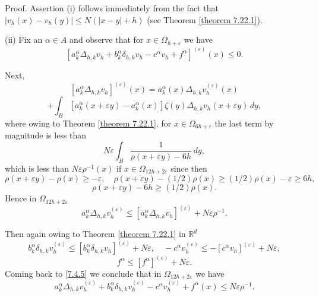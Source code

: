 \documentclass[11pt, reqno]{amsart}
\theoremstyle{definition}
\theoremstyle{remark}
\begin{document}
Proof. Assertion (i) follows immediately from the fact that
$|v_{h}(x)-v_{h}(y)|\leq N(|x-y|+h)$ (see
Theorem \ref{theorem 7.22.1}).

(ii) Fix an $\alpha\in A$ and
observe that for $x\in\Omega_{h+\varepsilon}$ we have
\begin{equation}
                                                    \label{7.4.5}
[ a_{k}^{\alpha} \Delta_{h,k}v _{h} 
+b_{k}^{\alpha} \delta_{h,k}v _{h} 
-c^{\alpha} v _{h} +f^{\alpha} ]
^{ (\varepsilon)} (x)\leq0.
\end{equation}

Next,
$$
[ a_{k}^{\alpha} \Delta_{h,k}v _{h} ]
^{ (\varepsilon)} (x)=a_{k}^{\alpha}(x)
\Delta_{h,k}v^{ (\varepsilon)}_{h}  
 (x)
$$
$$
+\int_{B }[a_{k}^{\alpha}(x
+\varepsilon y)-a_{k}^{\alpha}(x)]\zeta(y)
\Delta_{h,k}v _{h}(x
+\varepsilon y)\,dy,
$$
where owing to Theorem \ref{theorem 7.22.1},
for $x\in\Omega_{6h+\varepsilon}$ the last term by magnitude
is less than
$$
N\varepsilon\int_{B }\frac{1}{\rho(x+\varepsilon y)-6h}\,dy,
$$
which is less than $N\varepsilon \rho^{-1}(x)$ if
$x\in\Omega_{12h+2\varepsilon}$ since then
$$
\rho(x+\varepsilon y)-\rho(x)\geq-\varepsilon,
\quad  \rho(x+\varepsilon y)-(1/2)\rho(x)\geq(1/2)\rho(x)
-\varepsilon\geq 6h,
$$
$$
\rho(x+\varepsilon y)-6h\geq(1/2)\rho(x).
$$
Hence in $\Omega_{12h+2\varepsilon}$
$$
a_{k}^{\alpha} 
\Delta_{h,k}v^{ (\varepsilon)}_{h}  \leq 
[ a_{k}^{\alpha} \Delta_{h,k}v _{h} ]
^{ (\varepsilon)} + N\varepsilon \rho^{-1}.
$$

Then again owing to Theorem \ref{theorem 7.22.1}
in ${\mathbb{R}}^{d}$
$$
b_{k}^{\alpha} 
\delta_{h,k}v^{ (\varepsilon)}_{h} \leq 
[ b_{k}^{\alpha} \delta_{h,k}v _{h} ]
^{ (\varepsilon)}  + N\varepsilon,
\quad -c^{\alpha} 
 v^{ (\varepsilon)}_{h} \leq -[ c^{\alpha} v _{h} ]
^{ (\varepsilon)}   + N\varepsilon,
$$
$$
 f^{\alpha}  \leq [ f^{\alpha} ]
^{ (\varepsilon)} 
 + N\varepsilon .
$$
Coming back to \eqref{7.4.5} we conclude that in $\Omega_{12h+2\varepsilon}$
we have
\begin{equation}
                                                    \label{7.4.8}
  a_{k}^{\alpha} \Delta_{h,k}v _{h}^{ (\varepsilon)} 
+b_{k}^{\alpha} \delta_{h,k}v _{h}^{ (\varepsilon)} 
-c^{\alpha} v _{h}^{ (\varepsilon)} +f^{\alpha}  
 (x)\leq N\varepsilon \rho^{-1}.
\end{equation}
\end{document}
